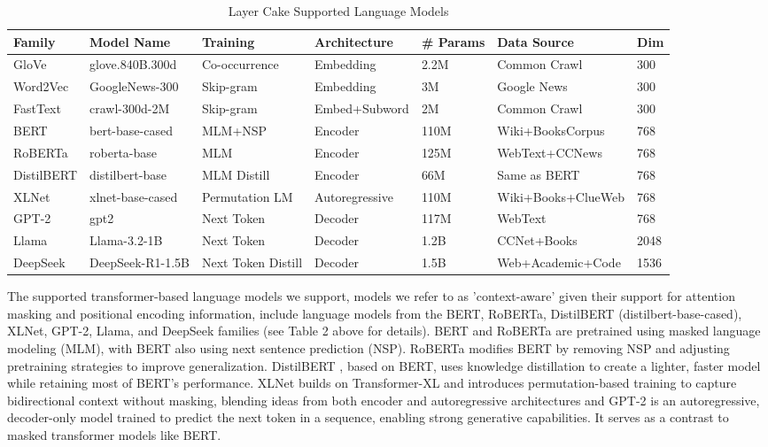 \documentclass[final]{clv2025}
\begin{document}
\begin{table}[h!]
\centering
\scriptsize
\caption{Layer Cake Supported Language Models}
\renewcommand{\arraystretch}{1.1}
\begin{tabular}{@{}p{1.2cm} p{2cm} p{1.8cm} p{1.7cm} p{1.2cm} p{2.2cm} p{0.7cm}@{}}
\toprule
\textbf{Family} & \textbf{Model Name} & \textbf{Training} & \textbf{Architecture} & \textbf{\# Params} & \textbf{Data Source} & \textbf{Dim} \\
\midrule
GloVe & glove.840B.300d & Co-occurrence & Embedding & 2.2M & Common Crawl & 300 \\
Word2Vec & GoogleNews-300 & Skip-gram & Embedding & 3M & Google News & 300 \\
FastText & crawl-300d-2M & Skip-gram & Embed+Subword & 2M & Common Crawl & 300 \\
\midrule
BERT & bert-base-cased & MLM+NSP & Encoder & 110M & Wiki+BooksCorpus & 768 \\
RoBERTa & roberta-base & MLM & Encoder & 125M & WebText+CCNews & 768 \\
DistilBERT & distilbert-base & MLM Distill & Encoder & 66M & Same as BERT & 768 \\
XLNet & xlnet-base-cased & Permutation LM & Autoregressive & 110M & Wiki+Books+ClueWeb & 768 \\
GPT-2 & gpt2 & Next Token & Decoder & 117M & WebText & 768 \\
Llama & Llama-3.2-1B & Next Token & Decoder & 1.2B & CCNet+Books & 2048 \\
DeepSeek & DeepSeek-R1-1.5B & Next Token Distill & Decoder & 1.5B & Web+Academic+Code & 1536 \\
\bottomrule
\end{tabular}
\end{table}

The supported transformer-based language models we support, models we refer to as 'context-aware' given their support for attention masking and positional encoding information, include language models from the BERT, RoBERTa, DistilBERT (distilbert-base-cased), XLNet, GPT-2, Llama, and DeepSeek families (see Table 2 above for details). BERT \cite{devlin-etal-2019-bert} and RoBERTa \cite{liu2019roberta} are pretrained using masked language modeling (MLM), with BERT also using next sentence prediction (NSP). RoBERTa modifies BERT by removing NSP and adjusting pretraining strategies to improve generalization. DistilBERT \cite{sanh2020distilbert}, based on BERT, uses knowledge distillation \cite{hinton2015distilling} to create a lighter, faster model while retaining most of BERT's performance. XLNet \cite{yang2019xlnet} builds on Transformer-XL \cite{dai2019transformer} and introduces permutation-based training to capture bidirectional context without masking, blending ideas from both encoder and autoregressive architectures and GPT-2 \cite{radford2019language} is an autoregressive, decoder-only model trained to predict the next token in a sequence, enabling strong generative capabilities. It serves as a contrast to masked transformer models like BERT. 
\end{document}
